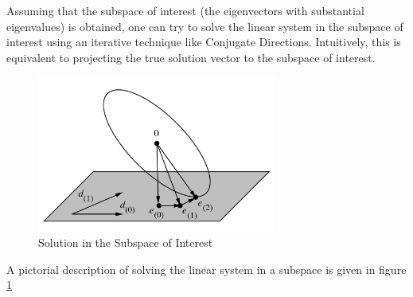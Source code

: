 \documentclass{article}
\begin{document}
Assuming that the subspace of interest (the eigenvectors with substantial eigenvalues) is obtained, one can try to solve the linear system in the subspace of interest using an iterative technique like Conjugate Directions. Intuitively, this is equivalent to projecting the true solution vector to the subspace of interest.
\begin{figure}[b!] \label{fig:subspace}
  \caption{Solution in the Subspace of Interest}
  \centering
    \includegraphics[width=0.7\textwidth]{subspace}
\end{figure}
A pictorial description of solving the linear system in a subspace is given in figure \ref{fig:subspace}
\end{document}
